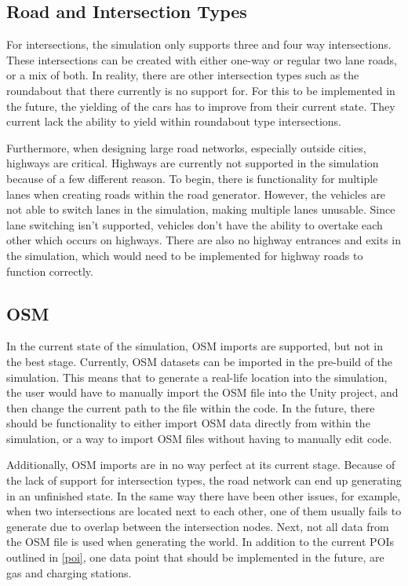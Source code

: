     \subsection{Road and Intersection Types}
        For intersections, the simulation only supports three and four way intersections. These intersections can be created with either one-way or regular two lane roads, or a mix of both. In reality, there are other intersection types such as the roundabout that there currently is no support for. For this to be implemented in the future, the yielding of the cars has to improve from their current state. They current lack the ability to yield within roundabout type intersections.
    
        Furthermore, when designing large road networks, especially outside cities, highways are critical. Highways are currently not supported in the simulation because of a few different reason. To begin, there is functionality for multiple lanes when creating roads within the road generator. However, the vehicles are not able to switch lanes in the simulation, making multiple lanes unusable. Since lane switching isn't supported, vehicles don't have the ability to overtake each other which occurs on highways. There are also no highway entrances and exits in the simulation, which would need to be implemented for highway roads to function correctly.

    \subsection{OSM}
        In the current state of the simulation, OSM imports are supported, but not in the best stage. Currently, OSM datasets can be imported in the pre-build of the simulation. This means that to generate a real-life location into the simulation, the user would have to manually import the OSM file into the Unity project, and then change the current path to the file within the code. In the future, there should be functionality to either import OSM data directly from within the simulation, or a way to import OSM files without having to manually edit code.
        
        Additionally, OSM imports are in no way perfect at its current stage. Because of the lack of support for intersection types, the road network can end up generating in an unfinished state. In the same way there have been other issues, for example, when two intersections are located next to each other, one of them usually fails to generate due to overlap between the intersection nodes. Next, not all data from the OSM file is used when generating the world. In addition to the current POIs outlined in \ref{poi}, one data point that should be implemented in the future, are gas and charging stations.

